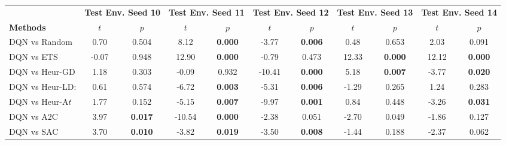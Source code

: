 \begin{tabular}{lcccccccccc}
	\toprule 
	& \multicolumn{2}{c}{\textbf{Test Env. Seed 10}} & \multicolumn{2}{c}{\textbf{Test Env. Seed 11}} & \multicolumn{2}{c}{\textbf{Test Env. Seed 12}} & \multicolumn{2}{c}{\textbf{Test Env. Seed 13}} & \multicolumn{2}{c}{\textbf{Test Env. Seed 14}} \\
	\cmidrule(lr){2-3} \cmidrule(lr){4-5} \cmidrule(lr){6-7} \cmidrule(lr){8-9} \cmidrule(lr){10-11}
	\textbf{Methods} & $t$              & $p$                         & $t$              & $p$                         & $t$              & $p$                         & $t$              & $p$                         & $t$              & $p$                         \\
	\midrule 
	DQN vs Random    & 0.70           & 0.504                  & 8.12           & \textbf{0.000}         & -3.77          & \textbf{0.006}         & 0.48           & 0.653                  & 2.03           & 0.091                  \\
	DQN vs ETS       & -0.07          & 0.948                  & 12.90          & \textbf{0.000}         & -0.79          & 0.473                  & 12.33          & \textbf{0.000}         & 12.12          & \textbf{0.000}         \\
	DQN vs Heur-GD   & 1.18           & 0.303                  & -0.09          & 0.932                  & -10.41         & \textbf{0.000}         & 5.18           & \textbf{0.007}         & -3.77          & \textbf{0.020}         \\
	DQN vs Heur-LD:  & 0.61           & 0.574                  & -6.72          & \textbf{0.003}         & -5.31          & \textbf{0.006}         & -1.29          & 0.265                  & 1.24           & 0.283                  \\
	DQN vs Heur-A$t$ & 1.77           & 0.152                  & -5.15          & \textbf{0.007}         & -9.97          & \textbf{0.001}         & 0.84           & 0.448                  & -3.26          & \textbf{0.031}         \\
	DQN vs A2C       & 3.97           & \textbf{0.017}         & -10.54         & \textbf{0.000}         & -2.38          & 0.051                  & -2.70          & 0.049                  & -1.86          & 0.127                  \\
	DQN vs SAC       & 3.70           & \textbf{0.010}         & -3.82          & \textbf{0.019}         & -3.50          & \textbf{0.008}         & -1.44          & 0.188                  & -2.37          & 0.062                  \\

\end{tabular}
